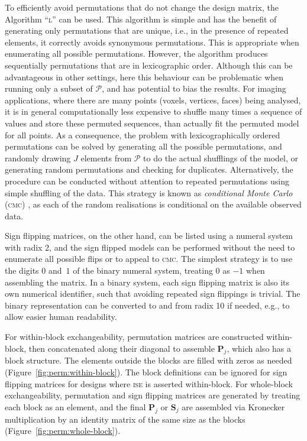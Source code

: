 To efficiently avoid permutations that do not change the design matrix, the Algorithm ``\textsc{l}'' \citep{Knuth2005} can be used. This algorithm is simple and has the benefit of generating only permutations that are unique, i.e., in the presence of repeated elements, it correctly avoids synonymous permutations. This is appropriate when enumerating all possible permutations. However, the algorithm produces sequentially permutations that are in lexicographic order. Although this can be advantageous in other settings, here this behaviour can be problematic when running only a subset of $\mathcal{P}$, and has potential to bias the results. For imaging applications, where there are many points (voxels, vertices, faces) being analysed, it is in general computationally less expensive to shuffle many times a sequence of values and store these permuted sequences, than actually fit the permuted model for all points. As a consequence, the problem with lexicographically ordered permutations can be solved by generating all the possible permutations, and randomly drawing $J$ elements from $\mathcal{P}$ to do the actual shufflings of the model,  or generating random permutations and checking for duplicates. Alternatively, the procedure can be conducted without attention to repeated permutations using simple shuffling of the data. This strategy is known as \emph{conditional Monte Carlo} (\textsc{cmc}) \citep{Trotter1956, Pesarin2010}, as each of the random realisations is conditional on the available observed data.

Sign flipping matrices, on the other hand, can be listed using a numeral system with radix 2, and the sign flipped models can be performed without the need to enumerate all possible flips or to appeal to \textsc{cmc}. The simplest strategy is to use the digits $0$ and~$1$ of the binary numeral system, treating 0 as $-1$ when assembling the matrix. In a binary system, each sign flipping matrix is also its own numerical identifier, such that avoiding repeated sign flippings is trivial. The binary representation can be converted to and from radix 10 if needed, e.g., to allow easier human readability.

For within-block exchangeability, permutation matrices are constructed within-block, then concatenated along their diagonal to assemble $\mathbf{P}_{j}$, which also has a block structure. The elements outside the blocks are filled with zeros as needed  (Figure~\ref{fig:perm:within-block}). The block definitions can be ignored for sign flipping matrices for designs where \textsc{ise} is asserted within-block. For whole-block exchangeability, permutation and sign flipping matrices are generated by treating each block as an element, and the final $\mathbf{P}_{j}$ or $\mathbf{S}_{j}$ are assembled via Kronecker multiplication by an identity matrix of the same size as the blocks (Figure~\ref{fig:perm:whole-block}).

